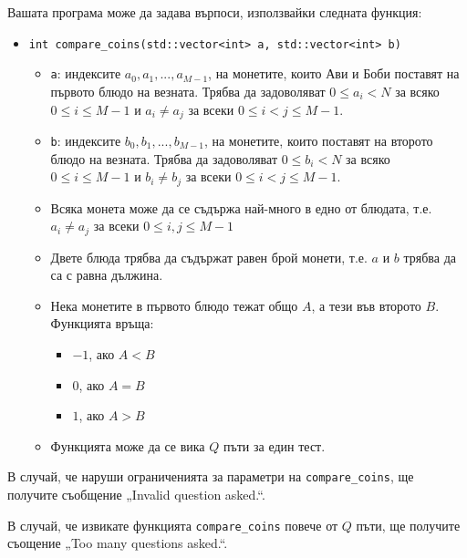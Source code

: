 \documentclass[a4paper,11pt]{article}
\newcommand{\code}[1]{\texttt{#1}}
\newcommand{\noskip}{\vspace{-\parskip}}
\begin{document}
Вашата програма може да задава върпоси, използвайки следната функция:
\noskip
\begin{itemize}
    \item \code{int compare\_coins(std::vector<int> a, std::vector<int> b)}
    \begin{itemize}
        \item \code{a}: индексите $a_0, a_1, ..., a_{M-1}$, на монетите, които
            Ави и Боби поставят на първото блюдо на везната. 
            Трябва да задоволяват $0 \leq a_i < N$ за всяко $0\leq i \leq M-1$ и
            $a_i \neq a_j$ за всеки $0\leq i < j \leq M-1$.
        \item \code{b}: индексите $b_0, b_1, ..., b_{M-1}$, на монетите, които
            поставят на второто блюдо на везната. 
            Трябва да задоволяват $0 \leq b_i < N$ за всяко $0\leq i \leq M-1$ и
            $b_i \neq b_j$ за всеки $0\leq i < j \leq M-1$.
        \item Всяка монета може да се съдържа най-много в едно от блюдата, т.е.
            $a_i \neq a_j$ за всеки $0\leq i, j \leq M-1$
        \item Двете блюда трябва да съдържат равен брой монети, т.е. $a$ и $b$
            трябва да са с равна дължина.
        \item Нека монетите в първото блюдо тежат общо $A$, а тези във второто
            $B$.
            Функцията връща:
        \begin{itemize}
            \item $-1$, ако $A < B$
            \item $0$, ако $A = B$
            \item $1$, ако $A > B$
        \end{itemize}
        \item Функцията може да се вика $Q$ пъти за един тест.
    \end{itemize}
\end{itemize}

В случай, че наруши ограниченията за параметри на \code{compare\_coins}, ще
получите съобщение „Invalid question asked.“.

В случай, че извикате функцията \code{compare\_coins} повече от $Q$ пъти, ще
получите съощение „Too many questions asked.“.
\end{document}
